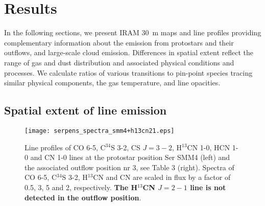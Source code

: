 \documentclass{aa}
\begin{document}
\section{Results} 
In the following sections, we present IRAM 30~m maps and line profiles 
providing complementary information about the emission from 
protostars and their outflows, and large-scale cloud emission.
Differences in spatial extent reflect the range of gas and dust 
distribution and associated physical conditions and processes. 
We calculate ratios of various transitions to 
pin-point species tracing similar physical components, the gas temperature,
and line opacities. 

\subsection{Spatial extent of line emission}
\begin{figure*} 
\texttt{[image: serpens\_spectra\_smm4+h13cn21.eps]} 
\caption{\label{spectra} Line profiles of CO 6-5, C$^{34}$S 3-2, CS $J=3-2$, H$^{13}$CN 1-0, HCN 1-0 and CN 1-0
 lines at the protostar position Ser SMM4 (left) and the associated outflow position nr 3, see Table 3 (right).
 Spectra of CO 6-5, C$^{34}$S 3-2, H$^{13}$CN and CN are scaled in flux by a factor of 0.5, 3, 5 and 2, respectively.
\textbf{The H$^{13}$CN $J=2-1$ line is not detected in the outflow position}.} 
 \end{figure*}
\end{document}
